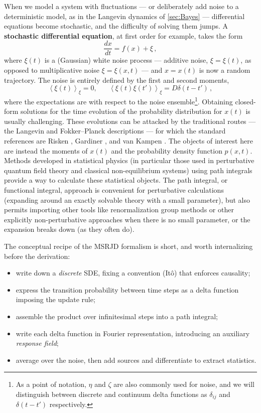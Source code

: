 \documentclass[11pt]{article}
\newcommand{\expval}[1]{\left\langle #1 \right\rangle}
\newcommand{\dv}[2]{\frac{d #1}{d #2}}
\begin{document}
When we model a system with fluctuations --- or deliberately add noise to a deterministic model, as in the Langevin dynamics of \cref{sec:Bayes} --- differential equations become stochastic, and the difficulty of solving them jumps. A \textbf{stochastic differential equation}, at first order for example, takes the form
\begin{equation}
    \dv{x}{t} = f(x) + \xi\,,
\end{equation}
where $\xi(t)$ is a (Gaussian) white noise process --- additive noise, $\xi = \xi(t)$, as opposed to multiplicative noise $\xi=\xi(x,t)$ --- and $x=x(t)$ is now a random trajectory.  The noise is entirely defined by the first and second moments,
\begin{equation}
    \expval{\xi(t)}_\xi = 0, \hspace{20pt} \expval{\xi(t)\xi(t')}_\xi = D \delta(t-t')\,,
\end{equation}
where the expectations are with respect to the noise ensemble\footnote{As a point of notation, $\eta$ and $\zeta$ are also commonly used for noise, and we will distinguish between discrete and continuum delta functions as $\delta_{ij}$ and $\delta(t-t')$ respectively.}.  Obtaining closed-form solutions for the time evolution of the probability distribution for $x(t)$ is usually challenging.  These evolutions can be attacked by the traditional routes --- the Langevin and Fokker--Planck descriptions --- for which the standard references are Risken \cite{risken1996fokker}, Gardiner \cite{gardiner2004handbook}, and van Kampen \cite{vankampen2007stochastic}. The objects of interest here are instead the moments of $x(t)$ and the probability density function $p(x,t).$  Methods developed in statistical physics (in particular those used in perturbative quantum field theory and classical non-equilibrium systems) using path integrals provide a way to calculate these statistical objects.  The path integral, or functional integral, approach is convenient for perturbative calculations (expanding around an exactly solvable theory with a small parameter), but also permits importing other tools like renormalization group methods or other explicitly non-perturbative approaches when there is no small parameter, or the expansion breaks down (as they often do). 

The conceptual recipe of the MSRJD formalism is short, and worth internalizing before the derivation:
\begin{itemize}
\item write down a \emph{discrete} SDE, fixing a convention (It\^o) that enforces causality;
\item express the transition probability between time steps as a delta function imposing the update rule;
\item assemble the product over infinitesimal steps into a path integral;
\item write each delta function in Fourier representation, introducing an auxiliary \emph{response field};
\item average over the noise, then add sources and differentiate to extract statistics.
\end{itemize}
\end{document}
